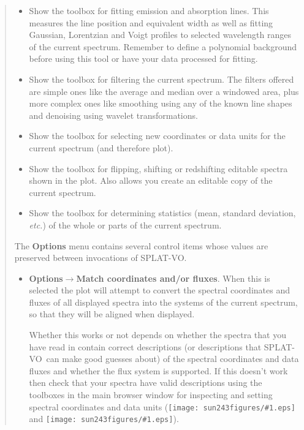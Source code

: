 \documentclass[twoside,11pt]{article}
\newcommand{\htmladdimg}[1]{}
\newcommand{\latexhtml}[2]{#1}
\renewcommand{\_}{\texttt{\symbol{95}}}
\newcommand{\SPLAT}{\textsf{SPLAT-VO}}
\newcommand{\inline}[1]
        {\latexhtml{\texttt{[image: sun243\_figures/\#1.eps]}}
        {\htmladdimg[align=center]{#1.gif}}}
\newcommand{\menuitem}[1]{\textbf{#1}}
\newcommand{\submenuitem}[2]{\latexhtml{\textbf{#1$\rightarrow$#2}}{\textbf{#1->#2}}}
\newcommand{\etc}{\textit{etc.}}
\begin{document}
\begin{quote}
\begin{itemize}
  \item[\inline{fitline}] Show the toolbox for fitting emission and absorption
  lines. This measures the line position and equivalent width as well as
  fitting Gaussian, Lorentzian and Voigt profiles to selected wavelength
  ranges of the current spectrum. Remember to define a polynomial background
  before using this tool or have your data processed for fitting.

  \item[\inline{filter}] Show the toolbox for filtering the current
  spectrum. The filters offered are simple ones like the average and
  median over a windowed area, plus more complex ones like smoothing
  using any of the known line shapes and denoising using wavelet
  transformations.

  \item[\inline{units}] Show the toolbox for selecting new coordinates or
  data units for the current spectrum (and therefore plot).

  \item[\inline{flip}] Show the toolbox for flipping, shifting or redshifting
  editable spectra shown in the plot. Also allows you create an editable copy
  of the current spectrum.

  \item[\inline{sigma}] Show the toolbox for determining statistics (mean,
  standard deviation, \etc) of the whole or parts of the current spectrum.

 \end{itemize}

 The \menuitem{Options} menu contains several control items whose values are
 preserved between invocations of \SPLAT.

 \begin{itemize}

  \item \submenuitem{Options}{Match coordinates and/or fluxes}.
  When this is selected the plot will attempt to convert the spectral
  coordinates and fluxes of all displayed spectra into the systems of the
  current spectrum, so that they will be aligned when displayed.

  Whether this works or not depends on whether the spectra that you have read
  in contain correct descriptions (or descriptions that \SPLAT\ can make good
  guesses about) of the spectral coordinates and data fluxes and whether the
  flux system is supported. If this doesn't work then check that your spectra
  have valid descriptions using the toolboxes in the main browser window for
  inspecting and setting spectral coordinates and data units
  (\inline{xunits} and \inline{yunits}).


\end{itemize}
\end{quote}
\end{document}
